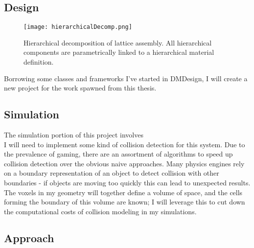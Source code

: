 {\subsection{Design}

\begin{figure}
  \texttt{[image: hierarchicalDecomp.png]}
  \caption{Hierarchical decomposition of lattice assembly. All hierarchical components are parametrically linked to a hierarchical material definition.}
  \label{fig:hierarchicalDecomp}
\end{figure}

Borrowing some classes and frameworks I've started in DMDesign, I will create a new project for the work spawned from this thesis.  



\subsection{Simulation}

The simulation portion of this project involves 
\\

I will need to implement some kind of collision detection for this system.  Due to the prevalence of gaming, there are an assortment of algorithms to speed up  collision detection over the obvious naive approaches.  Many physics engines rely on a boundary representation of an object to detect collision with other boundaries - if objects are moving too quickly this can lead to unexpected results.  The voxels in my geometry will together define a volume of space, and the cells forming the boundary of this volume are known; I will leverage this to cut down the computational costs of collision modeling in my simulations.

\subsection{Approach}

}
